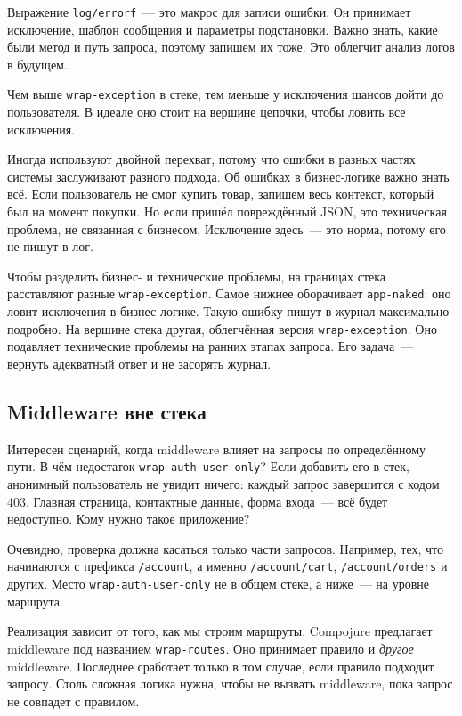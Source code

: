 \fi


Выражение \verb|log/errorf|~--- это макрос для записи ошибки. Он принимает
исключение, шаблон сообщения и параметры подстановки. Важно знать, какие были
метод и путь запроса, поэтому запишем их тоже. Это облегчит анализ логов в
будущем.

Чем выше \verb|wrap-exception| в стеке, тем меньше у исключения шансов дойти
до пользователя. В идеале оно стоит на вершине цепочки, чтобы ловить все
исключения.

Иногда используют двойной перехват, потому что ошибки в разных частях системы
заслуживают разного подхода. Об ошибках в бизнес-логике важно знать всё. Если
пользователь не смог купить товар, запишем весь контекст, который был на момент
покупки. Но если пришёл повреждённый JSON, это техническая проблема, не
связанная с бизнесом. Исключение здесь~--- это норма, потому его не пишут в лог.

Чтобы разделить бизнес- и технические проблемы, на границах стека расставляют
разные \verb|wrap-exception|. Самое нижнее оборачивает \texttt{app\--na\-ked}:
оно ловит исключения в бизнес-логике. Такую ошибку пишут в журнал максимально
подробно. На вершине стека другая, облегчённая версия \verb|wrap-exception|.
Оно подавляет технические проблемы на ранних этапах запроса. Его задача~---
вернуть адекватный ответ и не засорять журнал.

\subsection{Middleware вне стека}


Интересен сценарий, когда middleware влияет на запросы по определённому пути. В
чём недостаток \verb|wrap-auth-user-only|? Если добавить его в стек, анонимный
пользователь не увидит ничего: каждый запрос завершится с кодом 403. Главная
страница, контактные данные, форма входа~--- всё будет недоступно. Кому
нужно такое приложение?

\mnoindent
Очевидно, проверка должна касаться только части запросов. Например, тех, что
начинаются с префикса \verb|/account|, а именно \verb|/account/cart|,
\verb|/account/orders| и других. Место \texttt{wrap\--auth\--user\--only} не в общем
стеке, а ниже~--- на уровне маршрута.

Реализация зависит от того, как мы строим маршруты. Compojure предлагает
middleware под названием \verb|wrap-routes|. Оно принимает правило и
\emph{другое} middleware. Последнее сработает только в том случае, если правило
подходит запросу. Столь сложная логика нужна, чтобы не вызвать middleware, пока
запрос не совпадет с правилом.

